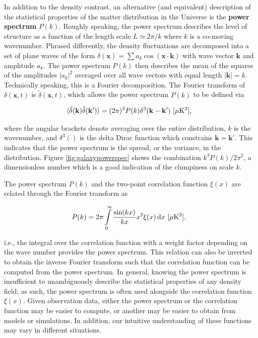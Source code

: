 \documentclass[a4paper,11pt]{article}
\begin{document}
{\noindent}In addition to the density contrast, an alternative (and equivalent) description of the statistical properties of the matter distribution in the Universe is the \textbf{power spectrum} $P(k)$. Roughly speaking, the power spectrum describes the level of structure as a function of the length scale $L \simeq 2\pi/k$ where $k$ is a co-moving wavenumber. Phrased differently, the density fluctuations are decomposed into a set of plane waves of the form $\delta(\mathbf{x}) = \sum a_k\cos(\mathbf{x\cdot k})$ with wave vector $\mathbf{k}$ and amplitude $a_k$. The power spectrum $P(k)$ then describes the mean of the squares of the amplitudes $\lvert a_k \rvert^2$ averaged over all wave vectors with equal length $\lvert\mathbf{k}\rvert = k$. Technically speaking, this is a Fourier decomposition. The Fourier transform of $\delta(\mathbf{x},t)$ is $\tilde{\delta}(\mathbf{x},t)$, which allows the power spectrum $P(k)$ to be defined via

\begin{align*}
    \langle \tilde{\delta}(\mathbf{k}) \tilde{\delta}(\mathbf{k'}) \rangle = (2\pi)^3 P(k) \delta^3 (\mathbf{k} - \mathbf{k'}) ~ [{\rm \mu K^2}],
\end{align*}

{\noindent}where the angular brackets denote averaging over the entire distribution, $k$ is the wavenumber, and $\delta^3()$ is the delta Dirac function which constrains $\mathbf{k}=\mathbf{k'}$. This indicates that the power spectrum is the spread, or the variance, in the distribution. Figure \ref{fig:galaxypowerspec} shows the combination $k^3P(k)/2\pi^2$, a dimensionless number which is a good indication of the clumpiness on scale $k$.

{\noindent}The power spectrum $P(k)$ and the two-point correlation function $\xi(x)$ are related through the Fourier transform as

\begin{align*}
    P(k) = 2\pi \int\limits_0^\infty \frac{\sin(kx)}{kx} x^2 \xi(x)\,{\rm d}x ~ [{\rm \mu K^2}],
\end{align*}

{\noindent}i.e., the integral over the correlation function with a weight factor depending on the wave number provides the power spectrum. This relation can also be inverted to obtain the inverse Fourier transform such that the correlation function can be computed from the power spectrum. In general, knowing the power spectrum is insufficient to unambiguously describe the statistical properties of any density field; as such, the power spectrum is often used alongside the correlation function $\xi(x)$. Given observation data, either the power spectrum or the correlation function may be easier to compute, or another may be easier to obtain from models or simulations. In addition, our intuitive understanding of these functions may vary in different situations.
\end{document}
